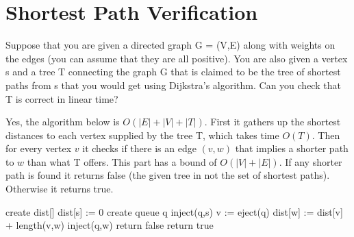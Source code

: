 \documentclass[11pt]{article}
\begin{document}
\section{Shortest Path Verification}
\par{Suppose that you are given a directed graph G = (V,E) along with weights on the edges (you can assume that they are all positive). You are also given a vertex s and a tree T connecting the graph G that is claimed to be the tree of shortest paths from s that you would get using Dijkstra's algorithm. Can you check that T is correct in linear time?}
\par{Yes, the algorithm below is $O(|E| + |V| + |T|)$. First it gathers up the shortest distances to each vertex supplied by the tree T, which takes time $O(T)$. Then for every vertex $v$ it checks if there is an edge $(v,w)$ that implies a shorter path to $w$ than what T offers. This part has a bound of $O(|V| + |E|)$. If any shorter path is found it returns false (the given tree in not the set of shortest paths). Otherwise it returns true.}
\begin{algorithmic}
\STATE create dist[]
\STATE dist[s] := 0
\STATE create queue q
\STATE inject(q,s)
\STATE v := eject(q)
\STATE dist[w] := dist[v] + length(v,w)
\STATE inject(q,w)
\ENDFOR
\ENDWHILE
{}
\STATE return false 
\ENDIF
\ENDFOR
\ENDFOR
\STATE return true
\end{algorithmic}
\newpage
\end{document}
